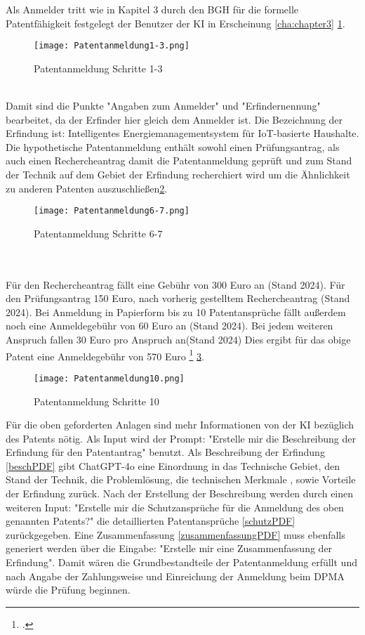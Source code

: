 Als Anmelder tritt wie in Kapitel 3 durch den BGH für die formelle 
Patentfähigkeit festgelegt der Benutzer
der KI in Erscheinung \ref{cha:chapter3} \ref{fig:Pat1-3}.
\begin{figure}[htb]
    \centering
    \texttt{[image: Patentanmeldung1-3.png]}\\
    \caption{ Patentanmeldung Schritte 1-3 }\label{fig:Pat1-3}
\end{figure}
\\
Damit sind die Punkte "Angaben zum Anmelder" und "Erfindernennung" bearbeitet, 
da der Erfinder hier gleich dem Anmelder ist.
Die Bezeichnung der Erfindung ist:
Intelligentes Energiemanagementsystem für IoT-basierte Haushalte.
Die hypothetische Patentanmeldung enthält sowohl einen Prüfungsantrag, 
als auch einen Rechercheantrag damit die Patentanmeldung
geprüft und zum Stand der Technik auf dem Gebiet 
der Erfindung recherchiert wird um die Ähnlichkeit
zu anderen Patenten auszuschließen\ref{fig:Pat6-7}.
\begin{figure}[htb]
    \centering
    \texttt{[image: Patentanmeldung6-7.png]}\\
    \caption{ Patentanmeldung Schritte 6-7 }\label{fig:Pat6-7}
\end{figure}
\\
\\
Für den Rechercheantrag fällt eine Gebühr von 300 Euro an (Stand 2024).
Für den Prüfungsantrag 150 Euro, nach vorherig gestelltem Rechercheantrag (Stand 2024).
Bei Anmeldung in Papierform bis zu 10 Patentansprüche fällt außerdem noch eine
Anmeldegebühr von 60 Euro an (Stand 2024). Bei jedem weiteren Anspruch
fallen 30 Euro pro Anspruch an(Stand 2024) Dies ergibt für das obige Patent 
eine Anmeldegebühr von 570 Euro \footcite{DPMAPatente} \ref{fig:Pat10}.
\begin{figure}[htb]
    \centering
    \texttt{[image: Patentanmeldung10.png]}\\
    \caption{ Patentanmeldung Schritte 10 }\label{fig:Pat10}
\end{figure}

Für die oben geforderten Anlagen sind mehr Informationen von der KI
bezüglich des Patents nötig.
Als Input wird der Prompt:
"Erstelle mir die Beschreibung der Erfindung für den Patentantrag" benutzt.
Als Beschreibung der Erfindung \ref{beschPDF} gibt ChatGPT-4o eine Einordnung 
in das Technische Gebiet, den Stand der Technik, die Problemlösung,
die technischen Merkmale , sowie Vorteile der Erfindung zurück.
Nach der Erstellung der Beschreibung werden durch einen weiteren Input:
"Erstelle mir die Schutzansprüche für die Anmeldung des oben genannten Patents?"
die detaillierten Patentansprüche \ref{schutzPDF} 
zurückgegeben.
Eine Zusammenfassung \ref{zusammenfassungPDF} muss ebenfalls
generiert werden über die Eingabe:
"Erstelle mir eine Zusammenfassung der Erfindung". 
Damit wären die Grundbestandteile der Patentanmeldung erfüllt und nach Angabe der 
Zahlungsweise und
Einreichung der Anmeldung beim DPMA würde die Prüfung beginnen. 

